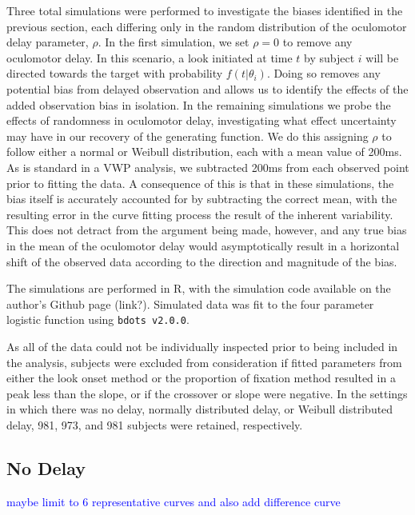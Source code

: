 \documentclass{article}
\newcommand{\xt}{\texttt}
\providecommand{\cn}[1]{\textcolor{blue}{#1}}
\begin{document}
Three total simulations were performed to investigate the biases identified in the previous section, each differing only in the random distribution of the oculomotor delay parameter, $\rho$. In the first simulation, we set $\rho = 0$ to remove any oculomotor delay. In this scenario, a look initiated at time $t$ by subject $i$ will be directed towards the target with probability $f(t|\theta_i)$. Doing so removes any potential bias from delayed observation and allows us to identify the effects of the added observation bias in isolation. In the remaining simulations we probe the effects of randomness in oculomotor delay, investigating what effect uncertainty may have in our recovery of the generating function. We do this assigning $\rho$ to follow either a normal or Weibull distribution, each with a mean value of 200ms. As is standard in a VWP analysis, we subtracted 200ms from each observed point prior to fitting the data. A consequence of this is that in these simulations, the bias itself is accurately accounted for by subtracting the correct mean, with the resulting error in the curve fitting process the result of the inherent variability. This does not detract from the argument being made, however, and any true bias in the mean of the oculomotor delay would asymptotically result in a horizontal shift of the observed data according to the direction and magnitude of the bias.

The simulations are performed in R, with the simulation code available on the author's Github page (link?). Simulated data was fit to the four parameter logistic function using \xt{bdots v2.0.0}.

As all of the data could not be individually inspected prior to being included in the analysis, subjects were excluded from consideration if fitted parameters from either the look onset method or the proportion of fixation method resulted in a peak less than the slope, or if the crossover or slope were negative. In the settings in which there was no delay, normally distributed delay, or Weibull distributed delay, 981, 973, and 981 subjects were retained, respectively.



\subsection{No Delay}

\cn{maybe limit to 6 representative curves and also add difference curve}
\end{document}
